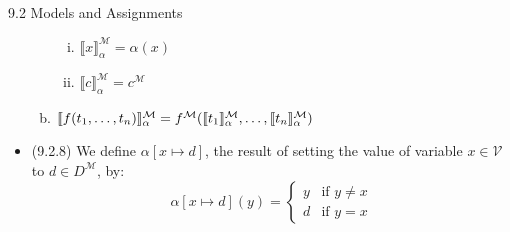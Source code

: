 \begin{frame}{9.2 Models and Assignments}
\begin{itemize}
\begin{enumerate}[(a)]
\begin{enumerate}[(i)]
					\item $\llbracket x\rrbracket_\alpha^\mathcal{M}=\alpha(x)$
					\item $\llbracket c\rrbracket_\alpha^\mathcal{M}=c^\mathcal{M}$
				
				\end{enumerate}
				
				\item $\llbracket f(t_1,\mathellipsis,t_n)\rrbracket_\alpha^\mathcal{M}=f^\mathcal{M}(\llbracket t_1\rrbracket_\alpha^\mathcal{M}, \mathellipsis, \llbracket t_n\rrbracket_\alpha^\mathcal{M})$
			
			\end{enumerate}
			
			\item (9.2.8) We define $\alpha[x\mapsto d]$, the result of setting the value of variable $x\in\mathcal{V}$ to $d\in D^\mathcal{M}$, by:
		\[\alpha[x\mapsto d](y)=\begin{cases} y &\text{if }y\neq x\\ d & \text{if }y=x\end{cases}\]		

	
	\end{itemize}

\end{frame}

